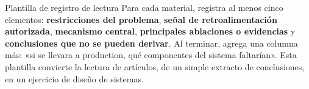 \begin{knowledgebox}{Plantilla de registro de lectura}
Para cada material, registra al menos cinco elementos: \textbf{restricciones del problema}, \textbf{señal de retroalimentación autorizada}, \textbf{mecanismo central}, \textbf{principales ablaciones o evidencias} y \textbf{conclusiones que no se pueden derivar}. Al terminar, agrega una columna más: «si se llevara a production, qué componentes del sistema faltarían». Esta plantilla convierte la lectura de artículos, de un simple extracto de conclusiones, en un ejercicio de diseño de sistemas.
\end{knowledgebox}


